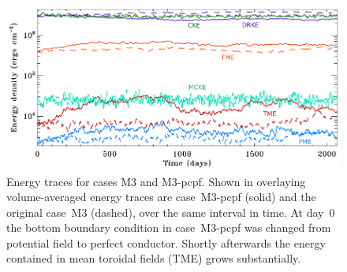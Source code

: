 \begin{figure}[!t]
  \begin{center}
    \includegraphics[width=\linewidth]{figs/chapter_8/Energy_overlay_M3_pcpf_vs_M3.eps}
  \end{center}
  \caption[Energy traces for cases M3 and M3-pcpf]
      {Energy traces for cases M3 and M3-pcpf. Shown
	in overlaying volume-averaged energy traces are case~M3-pcpf
	(solid) and the original case~M3 (dashed), over the same interval in time.
	At day~0 the bottom boundary condition in case~M3-pcpf was
	changed from potential field to perfect conductor.  Shortly
	afterwards the energy contained in mean toroidal fields (TME) grows
	substantially.
        \label{fig:M3-pcpf vs M3}}
      \vskip-0.5cm
\end{figure}

